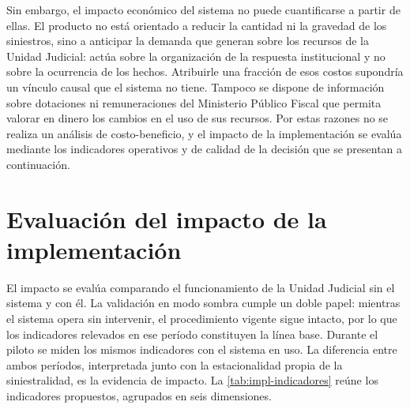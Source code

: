 Sin embargo, el impacto económico del sistema no puede cuantificarse a partir de ellas.
El producto no está orientado a reducir la cantidad ni la gravedad de los siniestros,
sino a anticipar la demanda que generan sobre los recursos de la Unidad Judicial: actúa
sobre la organización de la respuesta institucional y no sobre la ocurrencia de los
hechos. Atribuirle una fracción de esos costos supondría un vínculo causal que el sistema
no tiene. Tampoco se dispone de información sobre dotaciones ni remuneraciones del
Ministerio Público Fiscal que permita valorar en dinero los cambios en el uso de sus
recursos. Por estas razones no se realiza un análisis de costo-beneficio, y el impacto de
la implementación se evalúa mediante los indicadores operativos y de calidad de la
decisión que se presentan a continuación.

\section{Evaluación del impacto de la implementación}\label{sec:impl-impacto}

El impacto se evalúa comparando el funcionamiento de la Unidad Judicial sin el sistema y
con él. La validación en modo sombra cumple un doble papel: mientras el sistema opera sin
intervenir, el procedimiento vigente sigue intacto, por lo que los indicadores relevados
en ese período constituyen la línea base. Durante el piloto se miden los mismos
indicadores con el sistema en uso. La diferencia entre ambos períodos, interpretada junto
con la estacionalidad propia de la siniestralidad, es la evidencia de impacto. La
\cref{tab:impl-indicadores} reúne los indicadores propuestos, agrupados en seis
dimensiones.

